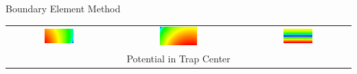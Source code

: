 \documentclass{beamer}
\begin{document}
\begin{frame}{Boundary Element Method}
\begin{table}
\begin{tabular}{ccc}
		\includegraphics[width=0.3\textwidth]{yz_5} &
		\includegraphics[width=0.3\textwidth]{yz_10} &
		\includegraphics[width=0.3\textwidth]{yz_rf} \\
		& Potential in Trap Center &
	\end{tabular}\end{table}
\end{frame}
\end{document}
